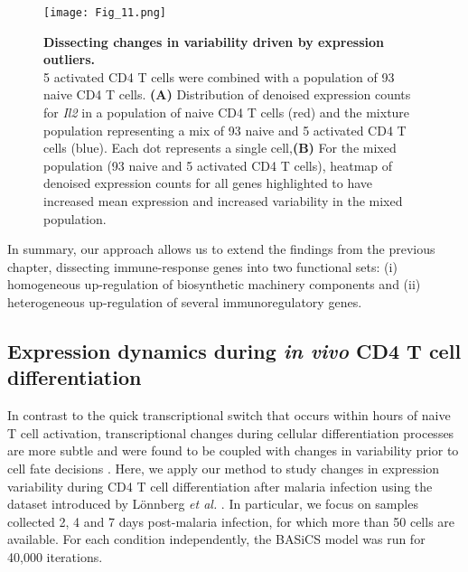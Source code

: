 \begin{figure}[!h]
\centering
\texttt{[image: Fig\_11.png]}
\caption[Dissecting changes in variability driven by expression outliers]{\textbf{Dissecting changes in variability driven by expression outliers.}\\
5 activated CD4\plus{} T cells were combined with a population of 93 naive CD4\plus{} T cells. \textbf{(A)} Distribution of denoised expression counts for \textit{Il2} in a population of naive CD4\plus{} T cells (red) and the mixture population representing a mix of 93 naive and 5 activated CD4\plus{} T cells (blue). Each dot represents a single cell,\textbf{(B)} For the mixed population (93 naive and 5 activated CD4\plus{} T cells), heatmap of denoised expression counts for all genes highlighted to have increased mean expression and increased variability in the mixed population.}
\label{fig2:mixture_population}
\end{figure}

In summary, our approach allows us to extend the findings from the previous chapter, dissecting immune-response genes into two functional sets: (i) homogeneous up-regulation of biosynthetic machinery components and (ii) heterogeneous up-regulation of several immunoregulatory genes.

\newpage

\subsection{Expression dynamics during \textit{in vivo} CD4\plus{} T cell differentiation}

In contrast to the quick transcriptional switch that occurs within hours of naive T cell activation, transcriptional changes during cellular differentiation processes are more subtle and were found to be coupled with changes in variability prior to cell fate decisions \citep{Richard2016, Mojtahedi2016}. Here, we apply our method to study changes in expression variability during CD4\plus{} T cell differentiation after malaria infection using the dataset introduced by L\"onnberg \emph{et al.} \cite{Lonnberg2017}. In particular, we focus on samples collected 2, 4 and 7 days post-malaria infection, for which more than 50 cells are available. For each condition independently, the BASiCS model was run for 40,000 iterations.\\

